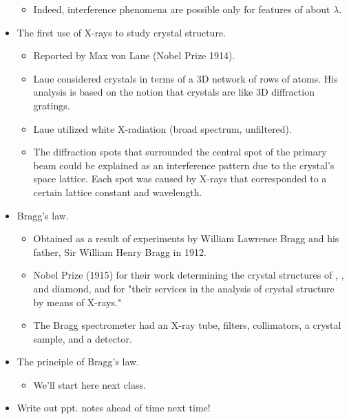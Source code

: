 \documentclass[../notes.tex]{subfiles}
\begin{document}
\begin{itemize}
\begin{itemize}
        \item Indeed, interference phenomena are possible only for features of about $\lambda$.
    \end{itemize}
    \item The first use of X-rays to study crystal structure.
    \begin{itemize}
        \item Reported by Max von Laue (Nobel Prize 1914).
        \item Laue considered crystals in terms of a 3D network of rows of atoms. His analysis is based on the notion that crystals are like 3D diffraction gratings.
        \item Laue utilized white X-radiation (broad spectrum, unfiltered).
        \item The diffraction spots that surrounded the central spot of the primary beam could be explained as an interference pattern due to the crystal's space lattice. Each spot was caused by X-rays that corresponded to a certain lattice constant and wavelength.
    \end{itemize}
    \item Bragg's law.
    \begin{itemize}
        \item Obtained as a result of experiments by William Lawrence Bragg and his father, Sir William Henry Bragg in 1912.
        \item Nobel Prize (1915) for their work determining the crystal structures of , , and diamond, and for "their services in the analysis of crystal structure by means of X-rays."
        \item The Bragg spectrometer had an X-ray tube, filters, collimators, a crystal sample, and a detector.
    \end{itemize}
    \item The principle of Bragg's law.
    \begin{itemize}
        \item We'll start here next class.
    \end{itemize}
    \item Write out ppt. notes ahead of time next time!
\end{itemize}
\end{document}
